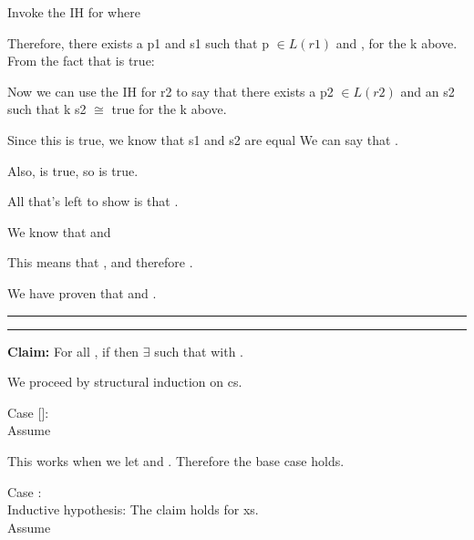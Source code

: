\documentclass[11pt,letterpaper]{article}
\newcommand{\question}[2] {\vspace{.25in} \hrule\vspace{0.5em}
\noindent{\bf #1: #2} \vspace{0.5em}
\hrule \vspace{.10in}}
\begin{document}
Invoke the IH for  where  

Therefore, there exists a p1 and s1 such that p $\in L(r1)$ and , for the k above.
From the fact that  is true:



Now we can use the IH for r2 to say that there exists a p2 $\in L(r2)$ and an s2 such that k s2 $\cong$ true for the k above.


Since this is true, we know that s1 and s2 are equal We can say that .

Also,  is true, so  is true.

All that's left to show is that . 

We know that  and 

This means that , and therefore .

We have proven that  and .
 

\question{3}{Task 2.6}
\textbf{Claim:} For all , if  then
$\exists$  such that  with .

We proceed by structural induction on cs.

Case []:\\
Assume 

This works when we let  and . Therefore the base case holds.

Case :\\
Inductive hypothesis: The claim holds for xs.\\
Assume \\
\end{document}
